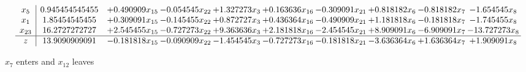 \documentclass[10pt]{article}
\begin{document}
\[\begin{array}{c| c c@{\hskip 2pt} c@{\hskip 2pt} c@{\hskip 2pt} c@{\hskip 2pt} c@{\hskip 2pt} c@{\hskip 2pt} c@{\hskip 2pt} c@{\hskip 2pt} }
 x_{5}   &  0.945454545455 & + 0.490909 x_{15} & -0.054545 x_{22} & + 1.327273 x_{3} & + 0.163636 x_{16} & -0.309091 x_{21} & + 0.818182 x_{6} & -0.818182 x_{7} & -1.654545 x_{8}\\
 x_{1}   &  1.85454545455 & + 0.309091 x_{15} & -0.145455 x_{22} & + 0.872727 x_{3} & + 0.436364 x_{16} & -0.490909 x_{21} & + 1.181818 x_{6} & -0.181818 x_{7} & -1.745455 x_{8}\\
 x_{23}   &  16.2727272727 & + 2.545455 x_{15} & -0.727273 x_{22} & + 9.363636 x_{3} & + 2.181818 x_{16} & -2.454545 x_{21} & + 8.909091 x_{6} & -6.909091 x_{7} & -13.727273 x_{8}\\
\hline
z    &  13.9090909091 & -0.181818 x_{15} & -0.090909 x_{22} & -1.454545 x_{3} & -0.727273 x_{16} & -0.181818 x_{21} & -3.636364 x_{6} & + 1.636364 x_{7} & + 1.909091 x_{8}\\
\end{array}\]


 $ x_{7} $ enters and $ x_{12} $ leaves 
\end{document}
